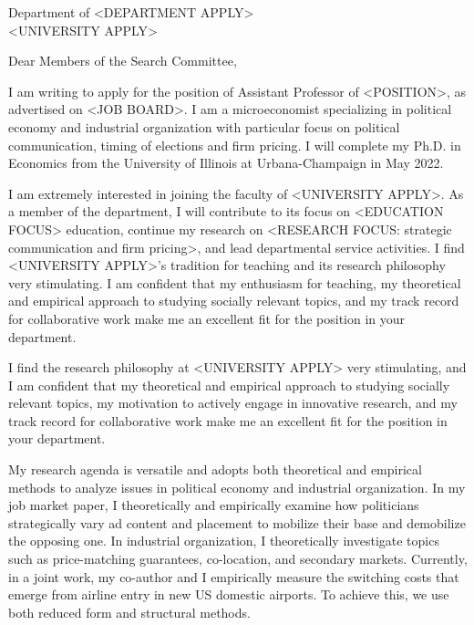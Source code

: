 \documentclass[12pt]{letter}
\begin{document}
\date{}
\begin{letter}{Department of <DEPARTMENT APPLY>\\
<UNIVERSITY APPLY>}

\opening{Dear Members of the Search Committee,}

I am writing to apply for the position of Assistant Professor of <POSITION>, as advertised on <JOB BOARD>.
I am a microeconomist specializing in political economy and industrial organization with particular focus on political communication, timing of elections and firm pricing.
I will complete my Ph.D. in Economics from the University of Illinois at Urbana-Champaign in May 2022. 

I am extremely interested in joining the faculty of <UNIVERSITY APPLY>.
As a member of the department, I will contribute to its focus on <EDUCATION FOCUS> education,
continue my research on <RESEARCH FOCUS: strategic communication and firm pricing>, and lead departmental service activities.
%
I find <UNIVERSITY APPLY>'s tradition for teaching and its research philosophy very stimulating.
I am confident that my enthusiasm for teaching, my theoretical and empirical approach to studying socially relevant topics, 
and my track record for collaborative work make me an excellent fit for the position in your department. 

I find the research philosophy at <UNIVERSITY APPLY> very stimulating, and 
I am confident that my theoretical and empirical approach to studying socially relevant topics, 
my motivation to actively engage in innovative research,
and my track record for collaborative work make me an excellent fit for the position in your department. 

My research agenda is versatile and adopts both theoretical and empirical methods to analyze issues in political economy and industrial organization.
In my job market paper, I theoretically and empirically examine how politicians strategically vary ad content and placement to mobilize their base and demobilize the opposing one.
In industrial organization, I theoretically investigate topics such as price-matching guarantees, co-location, and secondary markets.
Currently, in a joint work, my co-author and I empirically measure the switching costs that emerge from airline entry in new US domestic airports.
To achieve this, we use both reduced form and structural methods.


\end{letter}
\end{document}
